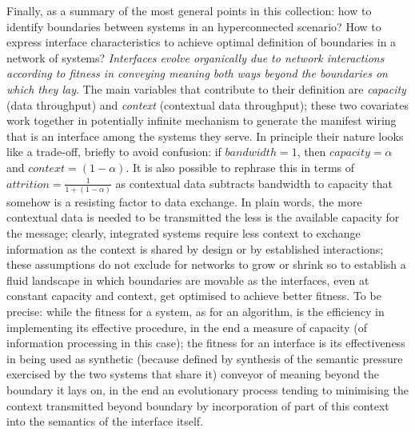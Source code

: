 \documentclass[14pt,a4paper]{extarticle}
\begin{document}
\hspace*{15mm}Finally, as a summary of the most general points in this collection: how to identify boundaries between systems in an hyperconnected scenario? How to express interface characteristics to achieve optimal definition of boundaries in a network of systems? \textit{Interfaces evolve organically due to network interactions according to fitness in conveying meaning both ways beyond the boundaries on which they lay}. The main variables that contribute to their definition are \textit{capacity} (data throughput) and \textit{context} (contextual data throughput); these two covariates work together in potentially infinite mechanism to generate the manifest wiring that is an interface among the systems they serve. In principle their nature looks like a trade-off, briefly to avoid confusion: if \(bandwidth = 1\), then \(capacity = \alpha\) and \(context = (1 - \alpha)\). It is also possible to rephrase this in terms of \(attrition = \frac{1} {1+ (1 - \alpha)}\) as contextual data subtracts bandwidth to capacity that somehow is a resisting factor to data exchange. 
In plain words, the more contextual data is needed to be transmitted the less is the available capacity for the message; clearly, integrated systems require less context to exchange information as the context is shared by design or by established interactions; these assumptions do not exclude for networks to grow or shrink so to establish a fluid landscape in which boundaries are movable as the interfaces, even at constant capacity and context, get optimised to achieve better fitness. To be precise: while the fitness for a system, as for an algorithm, is the efficiency in implementing its effective procedure, in the end a measure of capacity (of information processing in this case); the fitness for an interface is its effectiveness in being used as synthetic (because defined by synthesis of the semantic pressure exercised by the two systems that share it) conveyor of meaning beyond the boundary it lays on, in the end an evolutionary process tending to minimising the context transmitted beyond boundary by incorporation of part of this context into the semantics of the interface itself.
\newline
\end{document}
